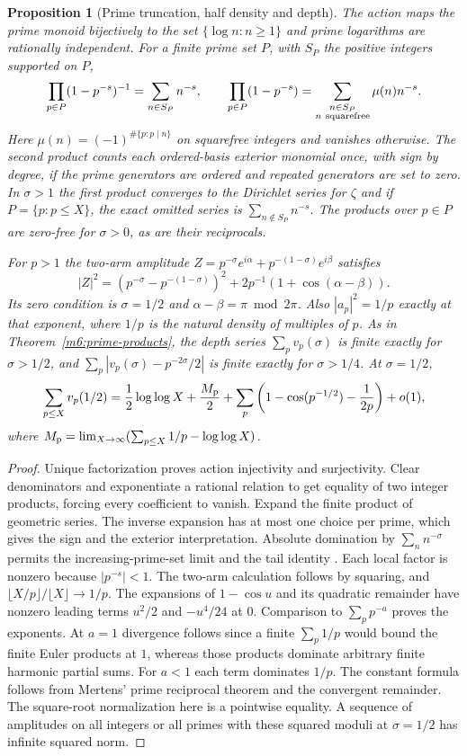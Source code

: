 \documentclass[11pt,reqno]{amsart}
\newtheorem{proposition}[theorem]{Proposition}
\theoremstyle{definition}
\theoremstyle{remark}
\numberwithin{equation}{section}
\begin{document}
\begin{proposition}[Prime truncation, half density and depth]\label{m8:prime}
The action maps the prime monoid bijectively to the set
$\{\log n:n\ge1\}$ and prime logarithms are rationally independent.
For a finite prime set $P$, with $S_P$ the positive integers
supported on $P$,
\[
 \prod_{p\in P}(1-p^{-s})^{-1}=\sum_{n\in S_P}n^{-s},\qquad
 \prod_{p\in P}(1-p^{-s})=\sum_{\substack{n\in S_P\\n\ {\rm squarefree}}}
                         \mu(n)n^{-s}.
\]
Here $\mu(n)=(-1)^{\#\{p:p\mid n\}}$ on squarefree integers and
vanishes otherwise. The second product counts each ordered-basis
exterior monomial once, with sign by degree, if the prime
generators are ordered and repeated generators are set to zero.
In $\sigma>1$ the first product converges to the Dirichlet
series for $\zeta$ and if $P=\{p:p\le X\}$, the exact omitted
series is $\sum_{n\notin S_P}n^{-s}$. The products over $p\in P$
are zero-free for $\sigma>0$, as are their reciprocals.

For $p>1$ the two-arm amplitude
$Z=p^{-\sigma}e^{i\alpha}+p^{-(1-\sigma)}e^{i\beta}$ satisfies
\[
 |Z|^2=(p^{-\sigma}-p^{-(1-\sigma)})^2+
       2p^{-1}(1+\cos(\alpha-\beta)).
\]
Its zero condition is $\sigma=1/2$ and $\alpha-\beta=\pi\bmod2\pi$.
Also $|a_p|^2=1/p$ exactly at that exponent, where $1/p$ is the
natural density of multiples of $p$. As in Theorem~\ref{m6:prime-products}, the depth series
$\sum_p v_p(\sigma)$ is finite exactly for $\sigma>1/2$, and
$\sum_p|v_p(\sigma)-p^{-2\sigma}/2|$ is finite exactly for
$\sigma>1/4$. At $\sigma=1/2$,
\[
 \sum_{p\le X}v_p(1/2)
  =\frac12\log\log X+\frac{M_{\rm p}}2+
      \sum_p\left(1-\cos(p^{-1/2})-\frac1{2p}\right)+o(1),
\]
where $M_{\rm p}=\lim_{X\to\infty}(\sum_{p\le X}1/p-\log\log X)$.
\end{proposition}
\begin{proof}
Unique factorization proves action injectivity and surjectivity.
Clear denominators and exponentiate a rational relation to get
equality of two integer products, forcing every coefficient to
vanish. Expand the finite product of geometric series. The
inverse expansion has at most one choice per prime, which gives
the sign and the exterior interpretation. Absolute domination
by $\sum_n n^{-\sigma}$ permits the increasing-prime-set limit
and the tail identity \cite[\S25.2]{m8:dlmf}. Each local factor is
nonzero because $|p^{-s}|<1$. The two-arm calculation follows by
squaring, and $\lfloor X/p\rfloor/\lfloor X\rfloor\to1/p$.
The expansions of $1-\cos u$ and its quadratic remainder have
nonzero leading terms $u^2/2$ and $-u^4/24$ at $0$. Comparison to
$\sum_p p^{-a}$ proves the exponents. At $a=1$ divergence follows
since a finite $\sum_p1/p$ would bound the finite Euler products
at $1$, whereas those products dominate arbitrary finite harmonic
partial sums. For $a<1$ each term dominates $1/p$. The constant
formula follows from Mertens' prime reciprocal theorem
\cite{m6:Mertens} and the convergent remainder.
The square-root normalization here is a pointwise equality.
A sequence of amplitudes on all integers or all primes with
these squared moduli at $\sigma=1/2$ has infinite squared norm.
\end{proof}
\end{document}
